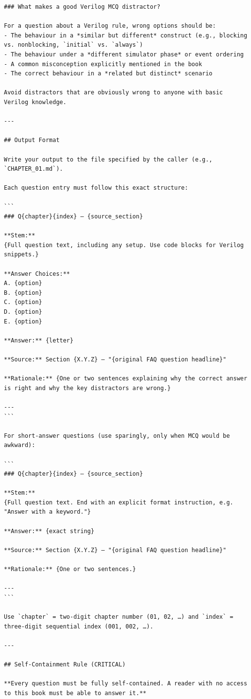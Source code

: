 \documentclass[letterpaper, 12pt]{article}
\begin{document}
\begin{appendices}
\begin{verbatim}
### What makes a good Verilog MCQ distractor?

For a question about a Verilog rule, wrong options should be:
- The behaviour in a *similar but different* construct (e.g., blocking vs. nonblocking, `initial` vs. `always`)
- The behaviour under a *different simulator phase* or event ordering
- A common misconception explicitly mentioned in the book
- The correct behaviour in a *related but distinct* scenario

Avoid distractors that are obviously wrong to anyone with basic Verilog knowledge.

---

## Output Format

Write your output to the file specified by the caller (e.g., `CHAPTER_01.md`).

Each question entry must follow this exact structure:

```
### Q{chapter}{index} — {source_section}

**Stem:**
{Full question text, including any setup. Use code blocks for Verilog snippets.}

**Answer Choices:**
A. {option}
B. {option}
C. {option}
D. {option}
E. {option}

**Answer:** {letter}

**Source:** Section {X.Y.Z} — "{original FAQ question headline}"

**Rationale:** {One or two sentences explaining why the correct answer is right and why the key distractors are wrong.}

---
```

For short-answer questions (use sparingly, only when MCQ would be awkward):

```
### Q{chapter}{index} — {source_section}

**Stem:**
{Full question text. End with an explicit format instruction, e.g. "Answer with a keyword."}

**Answer:** {exact string}

**Source:** Section {X.Y.Z} — "{original FAQ question headline}"

**Rationale:** {One or two sentences.}

---
```

Use `chapter` = two-digit chapter number (01, 02, …) and `index` = three-digit sequential index (001, 002, …).

---

## Self-Containment Rule (CRITICAL)

**Every question must be fully self-contained. A reader with no access to this book must be able to answer it.**


\end{verbatim}
\end{appendices}
\end{document}
